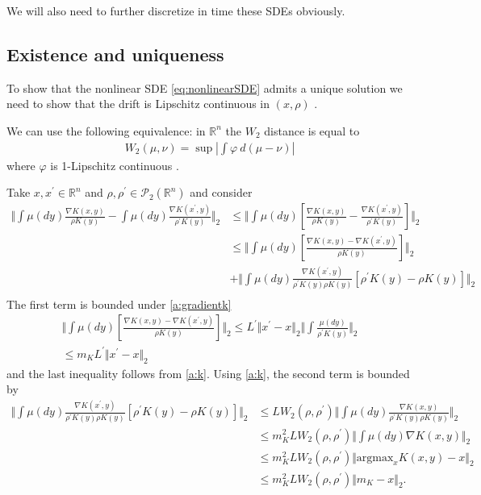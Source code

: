 \documentclass[a4paper]{article}
\theoremstyle{definition}
\newcommand{\norm}[2]{\ensuremath{\Vert #1 \Vert_{#2}}}
\def\real{\mathbb{R}}
\def\testfn{\varphi}
\begin{document}
We will also need to further discretize in time these SDEs obviously.

\subsection{Existence and uniqueness}
To show that the nonlinear SDE \eqref{eq:nonlinearSDE} admits a unique solution we need to show that the drift is Lipschitz continuous in $(x, \rho)$ \citep{jourdain2007nonlinear}.

We can use the following equivalence: in $\real^n$ the $W_2$ distance is equal to
\begin{align*}
W_2(\mu, \nu) = \sup\left\lvert \int \testfn \ d(\mu - \nu)\right\rvert
\end{align*}
where $\testfn$ is 1-Lipschitz continuous \citep[page 112]{santambrogio2017euclidean}.

Take $x, x^\prime\in \real^n$  and $\rho, \rho^\prime \in \mathcal{P}_2(\real^n)$ and consider
\begin{align*}
\norm{ \int\mu\left(dy\right)\frac{\nabla K(x,y)}{\rho K(y)}- \int\mu\left(dy\right)\frac{\nabla K(x^\prime,y)}{\rho^\prime K(y)}}{2} &\leq \norm{\int\mu\left(dy\right)\left[\frac{\nabla K(x,y)}{\rho K(y)}- \frac{\nabla K(x^\prime,y)}{\rho^\prime K(y)}\right]}{2} \\
&\leq \norm{\int\mu\left(dy\right)\left[\frac{\nabla K(x,y) - \nabla K(x^\prime,y)}{\rho K(y)}\right]}{2}\\
& +\norm{\int\mu\left(dy\right)\frac{\nabla K(x^\prime,y)}{\rho^\prime K(y)\rho K(y)}\left[\rho^\prime K(y) - \rho K(y)\right]}{2}
\\
\end{align*}
The first term is bounded under \ref{a:gradientk}
\begin{align*}
\norm{\int\mu\left(dy\right)\left[\frac{\nabla K(x,y) - \nabla K(x^\prime,y)}{\rho K(y)}\right]}{2} \leq L^\prime\norm{x^\prime - x}{2}\norm{\int\frac{\mu\left(dy\right)}{\rho^\prime K(y)}}{2}\\
\leq m_K L^\prime\norm{x^\prime - x}{2}
\end{align*}
and the last inequality follows from \ref{a:k}.
Using \ref{a:k}, the second term is bounded by
\begin{align*}
\norm{\int\mu\left(dy\right)\frac{\nabla K(x^\prime,y)}{\rho^\prime K(y)\rho K(y)}\left[\rho^\prime K(y) - \rho K(y)\right]}{2} &\leq LW_2(\rho, \rho^\prime)\norm{\int\mu\left(dy\right)\frac{\nabla K(x,y)}{\rho^\prime K(y)\rho K(y)}}{2}\\
&\leq m_K^2LW_2(\rho, \rho^\prime)\norm{\int\mu\left(dy\right)\nabla K(x,y)}{2}\\
&\leq m_K^2LW_2(\rho, \rho^\prime)\norm{\text{argmax}_{x} K(x, y) - x}{2}\\
&\leq m_K^2LW_2(\rho, \rho^\prime)\norm{m_K - x}{2}.
\end{align*}
\end{document}
